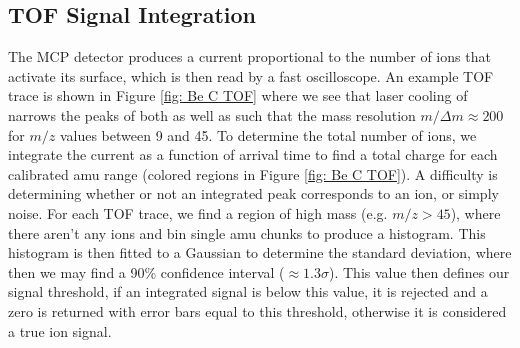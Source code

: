\subsection{TOF Signal Integration}

The MCP detector produces a current proportional to the number of ions that activate its surface, which is then read by a fast oscilloscope. An example TOF trace is shown in Figure \ref{fig: Be C TOF} where we see that laser cooling of  narrows the peaks of both  as well as  such that the mass resolution $m/\Delta m \approx 200$ for $m/z$ values between 9 and 45. To determine the total number of ions, we integrate the current as a function of arrival time to find a total charge for each calibrated amu range (colored regions in Figure \ref{fig: Be C TOF}). A difficulty is determining whether or not an integrated peak corresponds to an ion, or simply noise. For each TOF trace, we find a region of high mass (e.g. $m/z > 45$), where there aren't any ions and bin single amu chunks to produce a histogram. This histogram is then fitted to a Gaussian to determine the standard deviation, where then we may find a 90\% confidence interval ($\approx 1.3 \sigma$). This value then defines our signal threshold, if an integrated signal is below this value, it is rejected and a zero is returned with error bars equal to this threshold, otherwise it is considered a true ion signal.